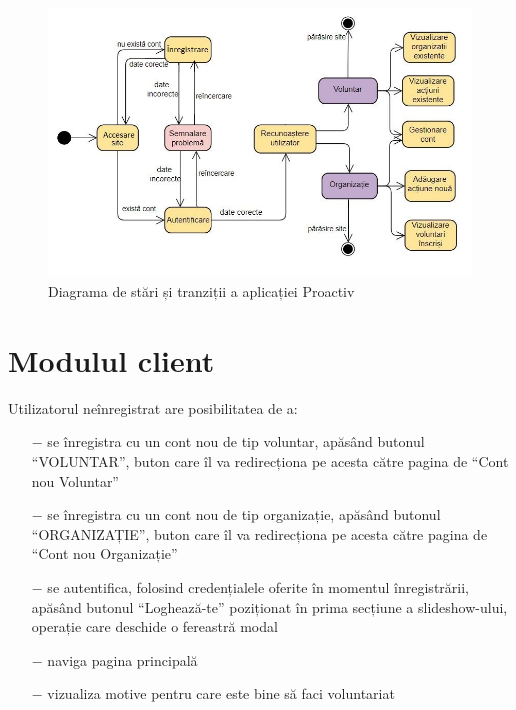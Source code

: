 \documentclass[12pt,a4paper]{report}
\begin{document}
\begin{figure}[h!]
\centering
  \includegraphics[width=0.9\linewidth]{./imagini/stateMachine.JPG}
  \caption{Diagrama de stări și tranziții a aplicației Proactiv}
\end{figure}

\newpage
\section{Modulul client}
\par
Utilizatorul neînregistrat are posibilitatea de a:
\\
\begin{itemize}
    \item[$-$] se înregistra cu un cont nou de tip voluntar, apăsând butonul  “VOLUNTAR”, buton care îl va redirecționa pe acesta către pagina de “Cont nou Voluntar”
    \item[$-$] se înregistra cu un cont nou de tip organizație, apăsând butonul  “ORGANIZAȚIE”, buton care îl va redirecționa pe acesta către pagina de “Cont nou Organizație”
    \item[$-$] se autentifica, folosind credențialele oferite în momentul înregistrării, apăsând butonul “Loghează-te” poziționat în prima secțiune a slideshow-ului, operație care deschide o fereastră modal
    \item[$-$] naviga pagina principală
    \item[$-$] vizualiza motive pentru care este bine să faci voluntariat
\end{itemize}
\end{document}
